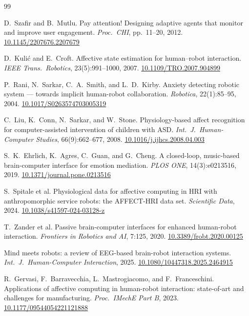\documentclass[11pt,a4paper]{article}
\begin{document}
\begin{thebibliography}{99}
\small

D.~Szafir and B.~Mutlu.
Pay attention! Designing adaptive agents that monitor and improve user engagement.
\emph{Proc.\ CHI}, pp.\ 11--20, 2012.
\href{https://doi.org/10.1145/2207676.2207679}{10.1145/2207676.2207679}

D.~Kuli\'{c} and E.~Croft.
Affective state estimation for human--robot interaction.
\emph{IEEE Trans.\ Robotics}, 23(5):991--1000, 2007.
\href{https://doi.org/10.1109/TRO.2007.904899}{10.1109/TRO.2007.904899}

P.~Rani, N.~Sarkar, C.~A.~Smith, and L.~D.~Kirby.
Anxiety detecting robotic system --- towards implicit human-robot collaboration.
\emph{Robotica}, 22(1):85--95, 2004.
\href{https://doi.org/10.1017/S0263574703005319}{10.1017/S0263574703005319}

C.~Liu, K.~Conn, N.~Sarkar, and W.~Stone.
Physiology-based affect recognition for computer-assisted intervention of children with ASD.
\emph{Int.\ J.\ Human-Computer Studies}, 66(9):662--677, 2008.
\href{https://doi.org/10.1016/j.ijhcs.2008.04.003}{10.1016/j.ijhcs.2008.04.003}

S.~K.~Ehrlich, K.~Agres, C.~Guan, and G.~Cheng.
A closed-loop, music-based brain-computer interface for emotion mediation.
\emph{PLOS ONE}, 14(3):e0213516, 2019.
\href{https://doi.org/10.1371/journal.pone.0213516}{10.1371/journal.pone.0213516}

S.~Spitale et al.
Physiological data for affective computing in HRI with anthropomorphic service robots: the AFFECT-HRI data set.
\emph{Scientific Data}, 2024.
\href{https://doi.org/10.1038/s41597-024-03128-z}{10.1038/s41597-024-03128-z}

T.~Zander et al.
Passive brain-computer interfaces for enhanced human-robot interaction.
\emph{Frontiers in Robotics and AI}, 7:125, 2020.
\href{https://doi.org/10.3389/frobt.2020.00125}{10.3389/frobt.2020.00125}

Mind meets robots: a review of EEG-based brain-robot interaction systems.
\emph{Int.\ J.\ Human-Computer Interaction}, 2025.
\href{https://doi.org/10.1080/10447318.2025.2464915}{10.1080/10447318.2025.2464915}

R.~Gervasi, F.~Barravecchia, L.~Mastrogiacomo, and F.~Franceschini.
Applications of affective computing in human-robot interaction: state-of-art and challenges for manufacturing.
\emph{Proc.\ IMechE Part B}, 2023.
\href{https://doi.org/10.1177/09544054221121888}{10.1177/09544054221121888}

\end{thebibliography}
\end{document}
